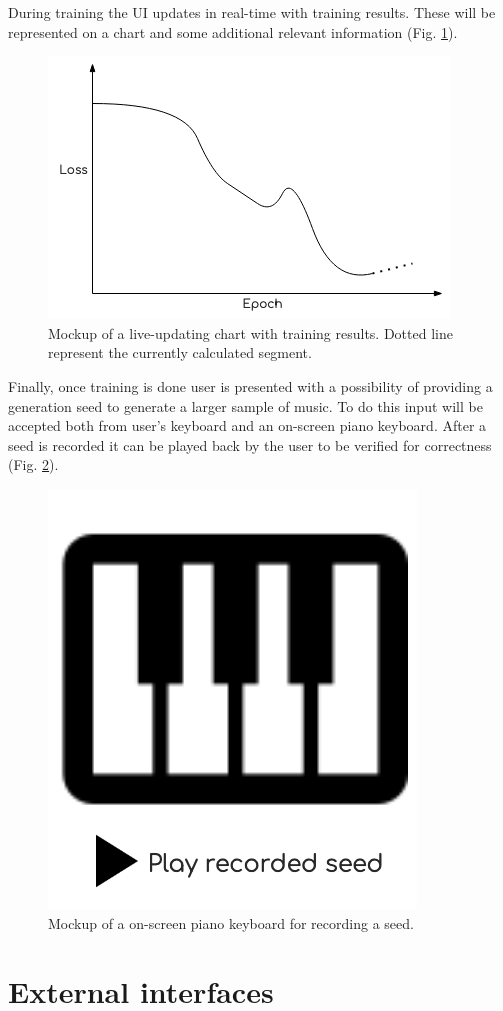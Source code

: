 \documentclass{article}
\begin{document}
During training the UI updates in real-time with training results. These will be represented on a chart and some additional relevant information (Fig. \ref{fig:gui_chart}).

\begin{figure}[H]
    \centering
    \includegraphics[width=0.5\linewidth]{gui_training_chart.png}
    \caption{Mockup of a live-updating chart with training results. Dotted line represent the currently calculated segment.}
    \label{fig:gui_chart}
\end{figure}

Finally, once training is done user is presented with a possibility of providing a generation seed to generate a larger sample of music. To do this input will be accepted both from user's keyboard and an on-screen piano keyboard. After a seed is recorded it can be played back by the user to be verified for correctness (Fig. \ref{fig:gui_record_seed}).

\begin{figure}[H]
    \centering
    \includegraphics[width=0.4\linewidth]{gui_record_seed.png}
    \caption{Mockup of a on-screen piano keyboard for recording a seed.}
    \label{fig:gui_record_seed}
\end{figure}

\section{External interfaces} \label{ex_interfaces} %
\end{document}
